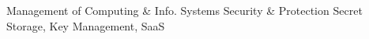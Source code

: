 \documentclass[10pt]{socc}
\begin{document}
         {Management of Computing \& Info. Systems}
         {Security \& Protection}
\keywords
Secret Storage, Key Management, SaaS








{
  \clearpage
  
  
}
\end{document}
